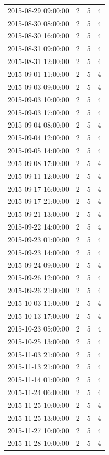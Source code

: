 \begin{tabular}{lrrr}
2015-08-29 09:00:00 & 2 & 5 & 4 \\
2015-08-30 08:00:00 & 2 & 5 & 4 \\
2015-08-30 16:00:00 & 2 & 5 & 4 \\
2015-08-31 09:00:00 & 2 & 5 & 4 \\
2015-08-31 12:00:00 & 2 & 5 & 4 \\
2015-09-01 11:00:00 & 2 & 5 & 4 \\
2015-09-03 09:00:00 & 2 & 5 & 4 \\
2015-09-03 10:00:00 & 2 & 5 & 4 \\
2015-09-03 17:00:00 & 2 & 5 & 4 \\
2015-09-04 08:00:00 & 2 & 5 & 4 \\
2015-09-04 12:00:00 & 2 & 5 & 4 \\
2015-09-05 14:00:00 & 2 & 5 & 4 \\
2015-09-08 17:00:00 & 2 & 5 & 4 \\
2015-09-11 12:00:00 & 2 & 5 & 4 \\
2015-09-17 16:00:00 & 2 & 5 & 4 \\
2015-09-17 21:00:00 & 2 & 5 & 4 \\
2015-09-21 13:00:00 & 2 & 5 & 4 \\
2015-09-22 14:00:00 & 2 & 5 & 4 \\
2015-09-23 01:00:00 & 2 & 5 & 4 \\
2015-09-23 14:00:00 & 2 & 5 & 4 \\
2015-09-24 09:00:00 & 2 & 5 & 4 \\
2015-09-26 12:00:00 & 2 & 5 & 4 \\
2015-09-26 21:00:00 & 2 & 5 & 4 \\
2015-10-03 11:00:00 & 2 & 5 & 4 \\
2015-10-13 17:00:00 & 2 & 5 & 4 \\
2015-10-23 05:00:00 & 2 & 5 & 4 \\
2015-10-25 13:00:00 & 2 & 5 & 4 \\
2015-11-03 21:00:00 & 2 & 5 & 4 \\
2015-11-13 21:00:00 & 2 & 5 & 4 \\
2015-11-14 01:00:00 & 2 & 5 & 4 \\
2015-11-24 06:00:00 & 2 & 5 & 4 \\
2015-11-25 10:00:00 & 2 & 5 & 4 \\
2015-11-25 13:00:00 & 2 & 5 & 4 \\
2015-11-27 10:00:00 & 2 & 5 & 4 \\
2015-11-28 10:00:00 & 2 & 5 & 4 \\

\end{tabular}
